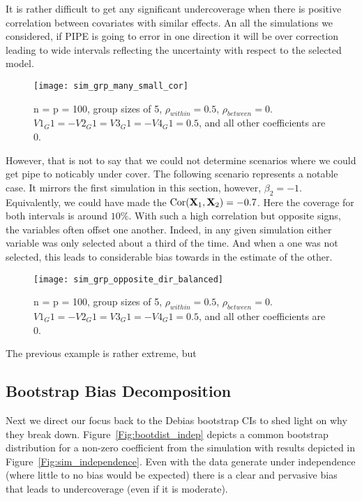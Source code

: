 It is rather difficult to get any significant undercoverage when there is positive correlation between covariates with similar effects. An all the simulations we considered, if PIPE is going to error in one direction it will be over correction leading to wide intervals reflecting the uncertainty with respect to the selected model.

\begin{figure}[hbtp]
    \begin{center}
    \texttt{[image: sim\_grp\_many\_small\_cor]}
    \caption{\label{Fig:sim_grp_many_small_cor} n = p = 100, group sizes of 5, $\rho_{within} = 0.5$, $\rho_{between} = 0$. $V1_G1 = -V2_G1 = V3_G1 = -V4_G1 = 0.5$, and all other coefficients are 0.}
    \end{center}
\end{figure}

However, that is not to say that we could not determine scenarios where we could get pipe to noticably under cover. The following scenario represents a notable case. It mirrors the first simulation in this section, however, $\beta_2 = -1$. Equivalently, we could have made the $\textrm{Cor}(\mathbf{X}_1, \mathbf{X}_2) = -0.7$. Here the coverage for both intervals is around $10\%$. With such a high correlation but opposite signs, the variables often offset one another. Indeed, in any given simulation either variable was only selected about a third of the time. And when a one was not selected, this leads to considerable bias towards in the estimate of the other.

\begin{figure}[hbtp]
    \begin{center}
    \texttt{[image: sim\_grp\_opposite\_dir\_balanced]}
    \caption{\label{Fig:sim_grp_opposite_dir_balanced} n = p = 100, group sizes of 5, $\rho_{within} = 0.5$, $\rho_{between} = 0$. $V1_G1 = -V2_G1 = V3_G1 = -V4_G1 = 0.5$, and all other coefficients are 0.}
    \end{center}
\end{figure}

The previous example is rather extreme, but

\subsection{Bootstrap Bias Decomposition}

Next we direct our focus back to the Debias bootstrap CIs to shed light on why they break down. Figure~\ref{Fig:bootdist_indep} depicts a common bootstrap distribution for a non-zero coefficient from the simulation with results depicted in Figure~\ref{Fig:sim_independence}. Even with the data generate under independence (where little to no bias would be expected) there is a clear and pervasive bias that leads to undercoverage (even if it is moderate).

